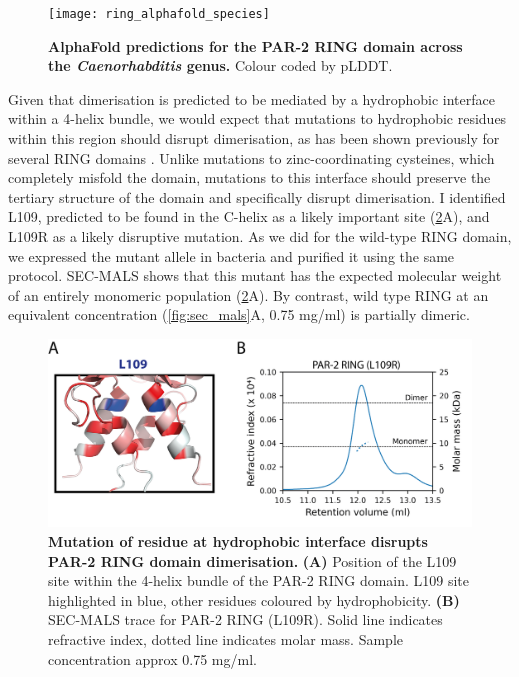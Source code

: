 \documentclass[12pt]{"report"}
\newcommand{\mycaption}[2]{\caption[#1]{\textbf{#1.} #2}}
\begin{document}
\begin{figure}
\texttt{[image: ring\_alphafold\_species]}
\centering
\mycaption{AlphaFold predictions for the PAR-2 RING domain across the \textit{Caenorhabditis} genus}{
Colour coded by pLDDT.
}
\label{fig:ring_alphafold_species}
\end{figure}

Given that dimerisation is predicted to be mediated by a hydrophobic interface within a 4-helix bundle, we would expect that mutations to hydrophobic residues within this region should disrupt dimerisation, as has been shown previously for several RING domains \citep{Koliopoulos2016, Rojas-Fernandez2014, Liew2010}. Unlike mutations to zinc-coordinating cysteines, which completely misfold the domain, mutations to this interface should preserve the tertiary structure of the domain and specifically disrupt dimerisation. I identified L109, predicted to be found in the C-helix as a likely important site (\cref{fig:l109r_sec_mals}A), and L109R as a likely disruptive mutation. As we did for the wild-type RING domain, we expressed the mutant allele in bacteria and purified it using the same protocol. SEC-MALS shows that this mutant has the expected molecular weight of an entirely monomeric population (\cref{fig:l109r_sec_mals}A). By contrast, wild type RING at an equivalent concentration (\cref{fig:sec_mals}A, 0.75 mg/ml) is partially dimeric.\\

\begin{figure}
\includegraphics[scale=1]{l109r_sec_mals}
\centering
\mycaption{Mutation of residue at hydrophobic interface disrupts PAR-2 RING domain dimerisation}{
\textbf{(A)} Position of the L109 site within the 4-helix bundle of the PAR-2 RING domain. L109 site highlighted in blue, other residues coloured by hydrophobicity.
\textbf{(B)} SEC-MALS trace for PAR-2 RING (L109R). Solid line indicates refractive index, dotted line indicates molar mass. Sample concentration approx 0.75 mg/ml.
}
\label{fig:l109r_sec_mals}
\end{figure}
\end{document}

